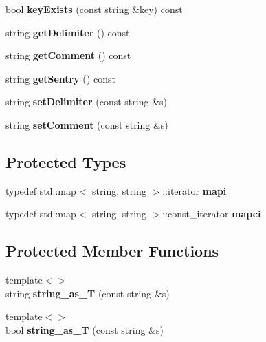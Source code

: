 \begin{DoxyCompactItemize}
bool {\bfseries key\+Exists} (const string \&key) const
\item 
\mbox{\label{class_config_file_ad5c780c8af0dc1c7cc701d1bbfe39dc2}} 
string {\bfseries get\+Delimiter} () const
\item 
\mbox{\label{class_config_file_a37b222022f77e1837b773a2e8ebed519}} 
string {\bfseries get\+Comment} () const
\item 
\mbox{\label{class_config_file_a41cd2b14758fd3c647b4591cd7ded327}} 
string {\bfseries get\+Sentry} () const
\item 
\mbox{\label{class_config_file_af28390aba7d8f399ac734c074e659b99}} 
string {\bfseries set\+Delimiter} (const string \&s)
\item 
\mbox{\label{class_config_file_a2e06b3000fb45426c975b334b2cee148}} 
string {\bfseries set\+Comment} (const string \&s)
\end{DoxyCompactItemize}
\subsection*{Protected Types}
\begin{DoxyCompactItemize}
\item 
\mbox{\label{class_config_file_a91de4778982f558673be7465f33750f5}} 
typedef std\+::map$<$ string, string $>$\+::iterator {\bfseries mapi}
\item 
\mbox{\label{class_config_file_af606aa032e366450b81792da67c984fc}} 
typedef std\+::map$<$ string, string $>$\+::const\+\_\+iterator {\bfseries mapci}
\end{DoxyCompactItemize}
\subsection*{Protected Member Functions}
\begin{DoxyCompactItemize}
\item 
\mbox{\label{class_config_file_a7d2b8acc0f7c2ea7892ef2e77d925ba9}} 
{\footnotesize template$<$$>$ }\\string {\bfseries string\+\_\+as\+\_\+T} (const string \&s)
\item 
\mbox{\label{class_config_file_adda9a4a7de5eef0151e45b5874ddf50d}} 
{\footnotesize template$<$$>$ }\\bool {\bfseries string\+\_\+as\+\_\+T} (const string \&s)
\end{DoxyCompactItemize}
